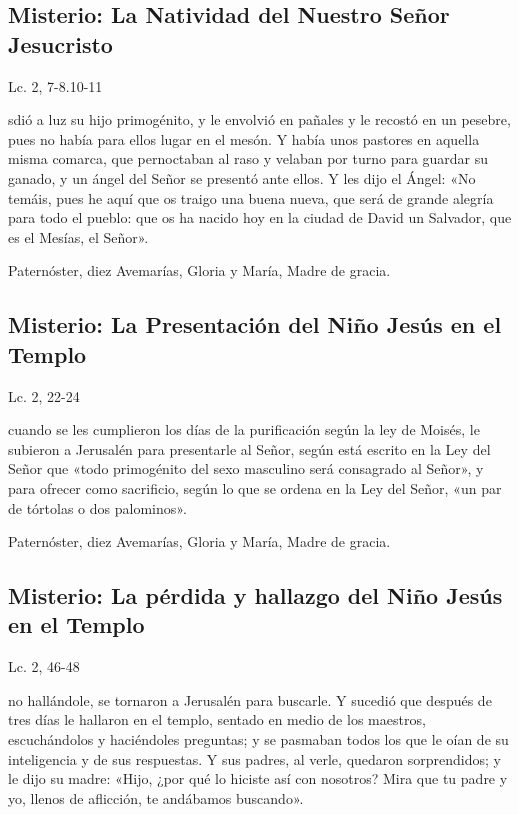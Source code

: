 \documentclass[./main.tex]{subfiles}
\newcounter{joyful-counter}
\begin{document}
\subsection*{ Misterio: La Natividad del Nuestro Señor Jesucristo}
\begin{flushright}
      {\color{red}Lc. 2, 7-8.10-11}
\end{flushright}
 sdió a luz su hijo primogénito, y le envolvió en pañales y le recostó en un pesebre, pues no había para ellos lugar en el mesón. 
Y había unos pastores en aquella misma comarca, que pernoctaban al raso y velaban por turno para guardar su ganado, y un ángel del Señor se presentó ante ellos. 
Y les dijo el Ángel: «No temáis, pues he aquí que os traigo una buena nueva, que será de grande alegría para todo el pueblo: 
que os ha nacido hoy en la ciudad de David un Salvador, que es el Mesías, el Señor».

\begin{center}
      Paternóster, diez Avemarías, Gloria y María, Madre de gracia.
\end{center}

\subsection*{ Misterio: La Presentación del Niño Jesús en el Templo}
\begin{flushright}
      {\color{red}Lc. 2, 22-24}
\end{flushright}
 cuando se les cumplieron los días de la purificación según la ley de Moisés, le subieron a Jerusalén para presentarle al Señor, 
según está escrito en la Ley del Señor que «todo primogénito del sexo masculino será consagrado al Señor», y para ofrecer como sacrificio, 
según lo que se ordena en la Ley del Señor, «un par de tórtolas o dos palominos».

\begin{center}
      Paternóster, diez Avemarías, Gloria y María, Madre de gracia.
\end{center}

\subsection*{ Misterio: La pérdida y hallazgo del Niño Jesús en el Templo}
\begin{flushright}
      {\color{red}Lc. 2, 46-48}
\end{flushright}
 no hallándole, se tornaron a Jerusalén para buscarle. Y sucedió que después de tres días le hallaron en el templo, 
sentado en medio de los maestros, escuchándolos y haciéndoles preguntas; y se pasmaban todos los que le oían de su inteligencia y de sus respuestas. 
Y sus padres, al verle, quedaron sorprendidos; y le dijo su madre: «Hijo, ¿por qué lo hiciste así con nosotros? Mira que tu padre y yo, llenos de aflicción, 
te andábamos buscando».
\end{document}
